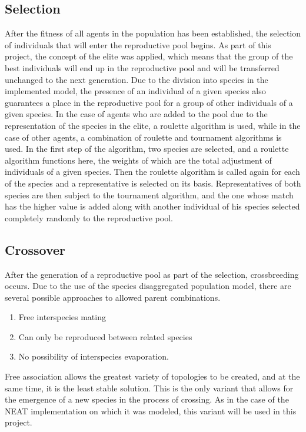 \subsection{Selection}
After the fitness of all agents in the population has been established, the selection of 
individuals that will enter the reproductive pool begins. As part of this project, the concept 
of the elite was applied, which means that the group of the best individuals will end up in the 
reproductive pool and will be transferred unchanged to the next generation. 
Due to the division into species in the implemented model, the presence of an individual of 
a given species also guarantees a place in the reproductive pool for a group of other individuals 
of a given species.
In the case of agents who are added to the pool due to the representation of the species in 
the elite, a roulette algorithm is used, while in the case of other agents, a combination of 
roulette and tournament algorithms is used.
In the first step of the algorithm, two species are selected, and a roulette algorithm functions 
here, the weights of which are the total adjustment of individuals of a given species. 
Then the roulette algorithm is called again for each of the species and a representative is 
selected on its basis. 
Representatives of both species are then subject to the tournament algorithm, and the one whose 
match has the higher value is added along with another individual of his species selected 
completely randomly to the reproductive pool.

\FloatBarrier
\subsection{Crossover}
After the generation of a reproductive pool as part of the selection, crossbreeding occurs. 
Due to the use of the species disaggregated population model, there are several possible approaches 
to allowed parent combinations. 
\begin{enumerate}
	\item Free interspecies mating
	\item Can only be reproduced between related species
	\item No possibility of interspecies evaporation.
\end{enumerate}
Free association allows the greatest variety of topologies to be created, and at the same time, 
it is the least stable solution. 
This is the only variant that allows for the emergence of a new species in the process of 
crossing. 
As in the case of the NEAT implementation on which it was modeled, this variant will be used 
in this project.


